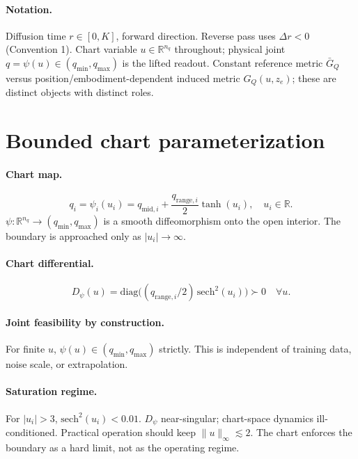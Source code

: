 \documentclass[11pt,a4paper]{article}
\newcommand{\R}{\mathbb{R}}
\newcommand{\GQ}{G_Q}
\newcommand{\GQbar}{\bar G_Q}
\newcommand{\psimap}{\psi}
\newcommand{\Dpsi}{D_\psimap}
\begin{document}
\paragraph{Notation.} Diffusion time $r \in [0, K]$, forward direction. Reverse pass uses $\Delta r < 0$ (Convention 1). Chart variable $u \in \R^{n_q}$ throughout; physical joint $q = \psi(u) \in (q_\text{min}, q_\text{max})$ is the lifted readout. Constant reference metric $\GQbar$ versus position/embodiment-dependent induced metric $\GQ(u, z_e)$; these are distinct objects with distinct roles.

\section{Bounded chart parameterization}
\label{sec:bounded-chart}

\paragraph{Chart map.}
\begin{equation}
q_i = \psi_i(u_i) = q_{\text{mid},i} + \frac{q_{\text{range},i}}{2} \tanh(u_i), \quad u_i \in \R.
\end{equation}
$\psi : \R^{n_q} \to (q_\text{min}, q_\text{max})$ is a smooth diffeomorphism onto the open interior. The boundary is approached only as $|u_i| \to \infty$.

\paragraph{Chart differential.}
\begin{equation}
\Dpsi(u) = \mathrm{diag}\bigl((q_{\text{range},i}/2)\, \mathrm{sech}^2(u_i)\bigr) \succ 0 \quad \forall u.
\end{equation}

\paragraph{Joint feasibility by construction.} For finite $u$, $\psi(u) \in (q_\text{min}, q_\text{max})$ strictly. This is independent of training data, noise scale, or extrapolation.

\paragraph{Saturation regime.} For $|u_i| > 3$, $\mathrm{sech}^2(u_i) < 0.01$. $\Dpsi$ near-singular; chart-space dynamics ill-conditioned. Practical operation should keep $\|u\|_\infty \lesssim 2$. The chart enforces the boundary as a hard limit, not as the operating regime.
\end{document}
